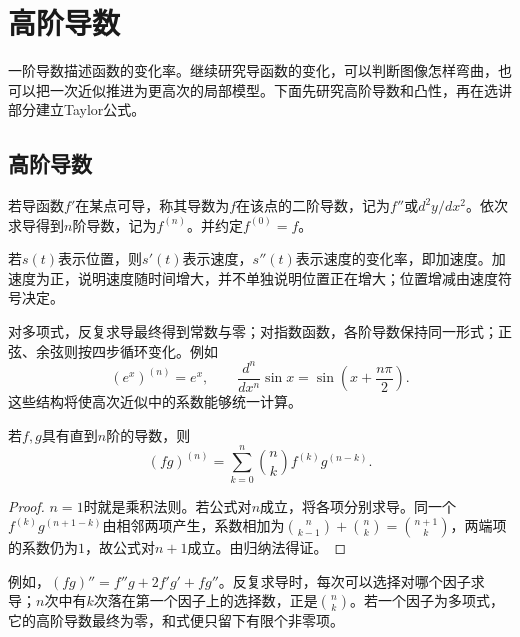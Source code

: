 \FloatBarrier
\newpage
\section{高阶导数}
\label{sec:calculus-higher-derivatives}

\begingroup
\setlength{\parskip}{4pt}
\setlength{\abovedisplayskip}{10pt}
\setlength{\belowdisplayskip}{10pt}

一阶导数描述函数的变化率。继续研究导函数的变化，可以判断图像怎样弯曲，也可以把一次近似推进为更高次的局部模型。下面先研究高阶导数和凸性，再在选讲部分建立Taylor公式。

\subsection{高阶导数}

\begin{definition}
若导函数\(f'\)在某点可导，称其导数为\(f\)在该点的{\heiti{}二阶导数}，记为\(f''\)或\(d^2y/dx^2\)。依次求导得到\(n\)阶导数，记为\(f^{(n)}\)。并约定\(f^{(0)}=f\)。
\end{definition}

若\(s(t)\)表示位置，则\(s'(t)\)表示速度，\(s''(t)\)表示速度的变化率，即加速度。加速度为正，说明速度随时间增大，并不单独说明位置正在增大；位置增减由速度符号决定。

对多项式，反复求导最终得到常数与零；对指数函数，各阶导数保持同一形式；正弦、余弦则按四步循环变化。例如
\begin{equation*}
 (e^x)^{(n)}=e^x,\qquad
 \frac{d^n}{dx^n}\sin x=\sin\left(x+\frac{n\pi}2\right).
\end{equation*}
这些结构将使高次近似中的系数能够统一计算。

\begin{theorem}[Leibniz公式]\label{thm:calculus-leibniz}
若\(f,g\)具有直到\(n\)阶的导数，则
\begin{equation}\label{eq:calculus-leibniz}
 (fg)^{(n)}=\sum_{k=0}^n\binom nk f^{(k)}g^{(n-k)}.
\end{equation}
\end{theorem}

\begin{proof}
\(n=1\)时就是乘积法则。若公式对\(n\)成立，将各项分别求导。同一个\(f^{(k)}g^{(n+1-k)}\)由相邻两项产生，系数相加为\(\binom n{k-1}+\binom nk=\binom{n+1}k\)，两端项的系数仍为\(1\)，故公式对\(n+1\)成立。由归纳法得证。
\end{proof}

例如，\((fg)''=f''g+2f'g'+fg''\)。反复求导时，每次可以选择对哪个因子求导；\(n\)次中有\(k\)次落在第一个因子上的选择数，正是\(\binom nk\)。若一个因子为多项式，它的高阶导数最终为零，和式便只留下有限个非零项。

